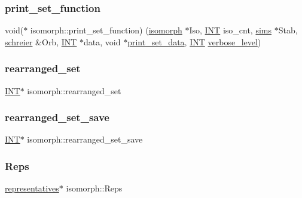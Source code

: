 \subsubsection{\texorpdfstring{print\+\_\+set\+\_\+function}{print\_set\_function}}
{\footnotesize\ttfamily void($\ast$ isomorph\+::print\+\_\+set\+\_\+function) (\mbox{\hyperlink{classisomorph}{isomorph}} $\ast$Iso, \mbox{\hyperlink{galois_8h_a09fddde158a3a20bd2dcadb609de11dc}{I\+NT}} iso\+\_\+cnt, \mbox{\hyperlink{classsims}{sims}} $\ast$Stab, \mbox{\hyperlink{classschreier}{schreier}} \&Orb, \mbox{\hyperlink{galois_8h_a09fddde158a3a20bd2dcadb609de11dc}{I\+NT}} $\ast$data, void $\ast$\mbox{\hyperlink{classisomorph_a6463ee99844c1d1b6b19589a8d39ae9d}{print\+\_\+set\+\_\+data}}, \mbox{\hyperlink{galois_8h_a09fddde158a3a20bd2dcadb609de11dc}{I\+NT}} \mbox{\hyperlink{simeon_8_c_a818073fbcc2f439e7c56952f67386122}{verbose\+\_\+level}})}

\mbox{\label{classisomorph_a32982f949055f6b1beff0b14b1e5ae9b}} 
\subsubsection{\texorpdfstring{rearranged\+\_\+set}{rearranged\_set}}
{\footnotesize\ttfamily \mbox{\hyperlink{galois_8h_a09fddde158a3a20bd2dcadb609de11dc}{I\+NT}}$\ast$ isomorph\+::rearranged\+\_\+set}

\mbox{\label{classisomorph_a6408269f849d07bc16218671feae4457}} 
\subsubsection{\texorpdfstring{rearranged\+\_\+set\+\_\+save}{rearranged\_set\_save}}
{\footnotesize\ttfamily \mbox{\hyperlink{galois_8h_a09fddde158a3a20bd2dcadb609de11dc}{I\+NT}}$\ast$ isomorph\+::rearranged\+\_\+set\+\_\+save}

\mbox{\label{classisomorph_a6b01aac4771fe6b8348396436f3b829f}} 
\subsubsection{\texorpdfstring{Reps}{Reps}}
{\footnotesize\ttfamily \mbox{\hyperlink{classrepresentatives}{representatives}}$\ast$ isomorph\+::\+Reps}

